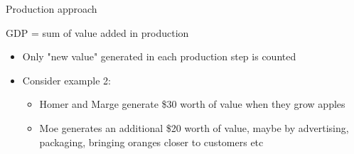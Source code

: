\documentclass[10pt]{beamer}
\begin{document}
\begin{frame}{Production approach}
\begin{block}{}
GDP = sum of value added in production
\end{block}
\bigskip

\begin{itemize}
    \item Only "new value" generated in each production step is counted \smallskip
    \item Consider example 2:
    \begin{itemize}
        \item Homer and Marge generate \$30 worth of value when they grow apples
        \item Moe generates an additional \$20 worth of value, maybe by advertising, packaging, bringing oranges closer to customers etc
    \end{itemize}
\end{itemize}
\end{frame}
\end{document}
